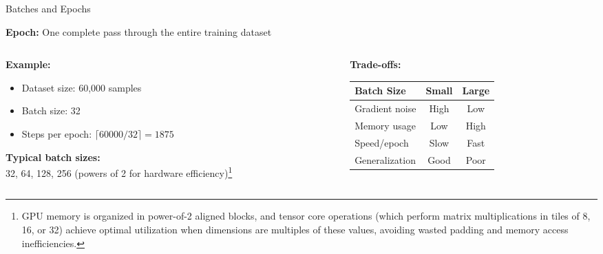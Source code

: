 \documentclass[xcolor=svgnames, 8pt, handout, standalone]{beamer}
\newcommand{\1}{\mathbf{1}}
\begin{document}
\begin{frame}{Batches and Epochs}
\begin{tcolorbox}[colback=lightblue, colframe=deepblue]
\textbf{Epoch:} One complete pass through the entire training dataset
\end{tcolorbox}

\vspace{1em}
\begin{columns}
\begin{column}{0.5\textwidth}
\textbf{Example:}
\begin{itemize}
\item Dataset size: 60,000 samples
\item Batch size: 32
\item Steps per epoch: $\lceil 60000/32 \rceil = 1875$
\end{itemize}

\vspace{0.5em}
\textbf{Typical batch sizes:}\\
32, 64, 128, 256 (powers of 2 for hardware efficiency)\footnote{GPU memory is organized in power-of-2 aligned blocks, and tensor core operations (which perform matrix multiplications in tiles of 8, 16, or 32) achieve optimal utilization when dimensions are multiples of these values, avoiding wasted padding and memory access inefficiencies.}
\end{column}
\begin{column}{0.5\textwidth}
\textbf{Trade-offs:}
\begin{center}
\begin{tabular}{|l|c|c|}
\hline
\textbf{Batch Size} & \textbf{Small} & \textbf{Large} \\
\hline
Gradient noise & High & Low \\
Memory usage & Low & High \\
Speed/epoch & Slow & Fast \\
Generalization & Good & Poor \\
\hline
\end{tabular}
\end{center}
\end{column}
\end{columns}
\end{frame}
\end{document}

